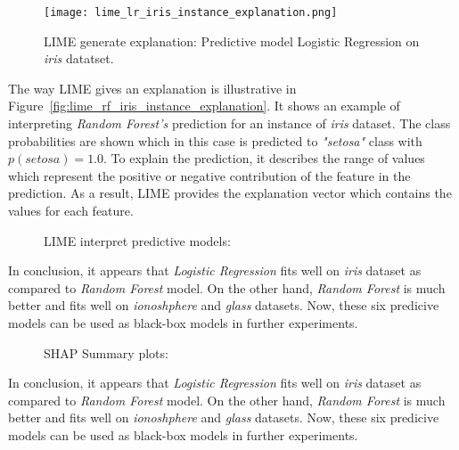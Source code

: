 \documentclass[english]{tktltiki2}
\theoremstyle{definition}
\theoremstyle{remark}
\begin{document}
\begin{figure}[H]
	\centering
	\vspace*{5mm}
	\texttt{[image: lime\_lr\_iris\_instance\_explanation.png]}
	\caption{LIME generate explanation: Predictive model Logistic Regression on \textit{iris} datatset.}
	\label{fig:lime_lr_iris_instance_explanation}
\end{figure} 
The way LIME gives an explanation is illustrative in Figure~\ref{fig:lime_rf_iris_instance_explanation}. It shows an example of interpreting \textit{Random Forest's} prediction for an instance of \textit{iris} dataset. The class probabilities are shown which in this case is predicted to \textit{"setosa"} class with $p(setosa)=1.0$. To explain the prediction, it describes the range of values which represent the positive or negative contribution of the feature in the prediction. As a result, LIME provides the explanation vector which contains the values for each feature.


\begin{figure}[H]
	\vspace*{0mm}
	\centering
	\qquad
	\caption{LIME interpret predictive models:}%
	\label{fig:lime_iris_instance_interpretations}%
\end{figure}

In conclusion, it appears that \textit{Logistic Regression} fits well on \textit{iris} dataset as compared to \textit{Random Forest} model. On the other hand, \textit{Random Forest} is much better and fits well on \textit{ionoshphere} and \textit{glass} datasets. Now, these six predicive models can be used as black-box models in further experiments.

\begin{figure}[H]
	\vspace*{0mm}
	\centering
	\qquad
	\caption{SHAP Summary plots:}%
	\label{fig:shap_iris_summary_plots}%
\end{figure}

In conclusion, it appears that \textit{Logistic Regression} fits well on \textit{iris} dataset as compared to \textit{Random Forest} model. On the other hand, \textit{Random Forest} is much better and fits well on \textit{ionoshphere} and \textit{glass} datasets. Now, these six predicive models can be used as black-box models in further experiments.
\end{document}
